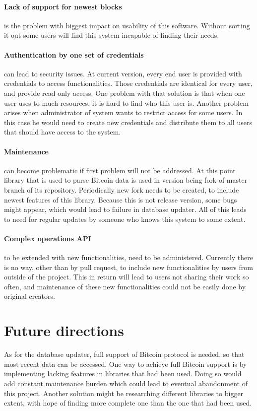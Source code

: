 \documentclass[12pt, en, eng, oneside]{mgr}
\begin{document}
\paragraph{Lack of support for newest blocks} is the problem with biggest impact on usability of this software. Without sorting it out some users will find this system incapable of finding their needs. 

\paragraph{Authentication by one set of credentials} can lead to security issues. At current version, every end user is provided with credentials to access functionalities. Those credentials are identical for every user, and provide read only access. One problem with that solution is that when one user uses to much resources, it is hard to find who this user is. Another problem arises when administrator of system wants to restrict access for some users. In this case he would need to create new credentials and distribute them to all users that should have access to the system.

\paragraph{Maintenance} can become problematic if first problem will not be addressed. At this point library that is used to parse Bitcoin data is used in version being fork of master branch of its repository. Periodically new fork needs to be created, to include newest features of this library. Because this is not release version, some bugs might appear, which would lead to failure in database updater. All of this leads to need for regular updates by someone who knows this system to some extent. 

\paragraph{Complex operations API} to be extended with new functionalities, need to be administered. Currently there is no way, other than by pull request, to include new functionalities by users from outside of the project. This in return will lead to users not sharing their work so often, and maintenance of these new functionalities could not be easily done by original creators.

\section{Future directions}
As for the database updater, full support of Bitcoin protocol is needed, so that most recent data can be accessed. One way to achieve full Bitcoin support is by implementing lacking features in libraries that had been used. Doing so would add constant maintenance burden which could lead to eventual abandonment of this project. Another solution might be researching different libraries to bigger extent, with hope of finding more complete one than the one that had been used.
\end{document}
